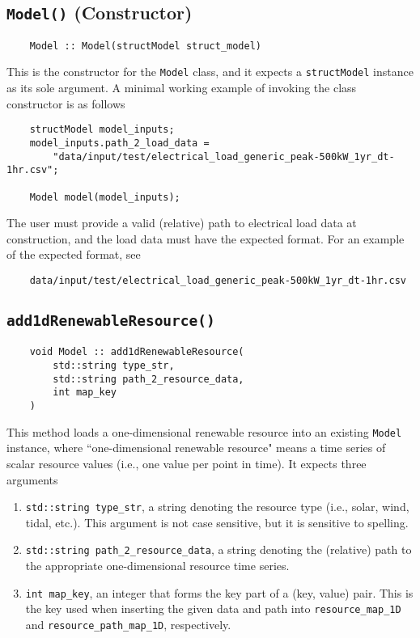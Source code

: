 \documentclass[12pt, letterpaper]{report}
\begin{document}
\subsection{\texttt{Model(\;\;)} (Constructor)}

\begin{verbatim}
    Model :: Model(structModel struct_model)
\end{verbatim}

This is the constructor for the \texttt{Model} class, and it expects a \texttt{structModel} instance as its sole argument. A minimal working example of invoking the class constructor is as follows

\begin{verbatim}
    structModel model_inputs;
    model_inputs.path_2_load_data =
        "data/input/test/electrical_load_generic_peak-500kW_1yr_dt-1hr.csv";

    Model model(model_inputs);
\end{verbatim}

\noindent The user must provide a valid (relative) path to electrical load data at construction, and the load data must have the expected format. For an example of the expected format, see

\begin{verbatim}
    data/input/test/electrical_load_generic_peak-500kW_1yr_dt-1hr.csv
\end{verbatim}

\subsection{\texttt{add1dRenewableResource(\;\;)}}

\begin{verbatim}
    void Model :: add1dRenewableResource(
        std::string type_str,
        std::string path_2_resource_data,
        int map_key
    )
\end{verbatim}

This method loads a one-dimensional renewable resource into an existing \texttt{Model} instance, where ``one-dimensional renewable resource" means a time series of scalar resource values (i.e., one value per point in time). It expects three arguments

\begin{enumerate}
    \item \texttt{std::string type\_str}, a string denoting the resource type (i.e., solar, wind, tidal, etc.). This argument is not case sensitive, but it is sensitive to spelling.
    \item \texttt{std::string path\_2\_resource\_data}, a string denoting the (relative) path to the appropriate one-dimensional resource time series.
    \item \texttt{int map\_key}, an integer that forms the key part of a (key, value) pair. This is the key used when inserting the given data and path into \texttt{resource\_map\_1D} and \texttt{resource\_path\_map\_1D}, respectively.
\end{enumerate}
\end{document}
